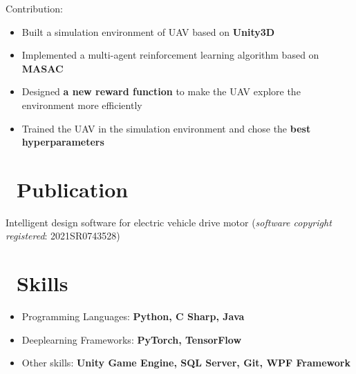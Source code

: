\documentclass{resume}
\begin{document}
Contribution:
\begin{itemize}
  \item Built a simulation environment of UAV based on \textbf{Unity3D}
  \item Implemented a multi-agent reinforcement learning algorithm based on \textbf{MASAC}
  \item Designed \textbf{a new reward function} to make the UAV explore the environment more efficiently
  \item Trained the UAV in the simulation environment and chose the \textbf{best hyperparameters}
\end{itemize}




\section{\faBook\ Publication}
Intelligent design software for electric vehicle drive motor (\textit{software copyright registered}: 2021SR0743528)


\section{\faCogs\ Skills}
\begin{itemize}[parsep=0.5ex]
  \item Programming Languages: \textbf{Python, C Sharp, Java}
  \item Deeplearning Frameworks: \textbf{PyTorch, TensorFlow}
  \item Other skills: \textbf{Unity Game Engine, SQL Server, Git, WPF Framework}
\end{itemize}
\end{document}
